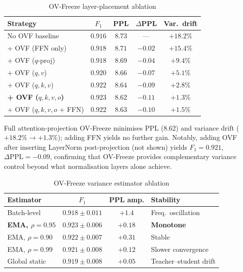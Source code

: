 \documentclass[lettersize,journal]{IEEEtran}
\begin{document}
\begin{table}[htbp]
\caption{OV-Freeze layer-placement ablation}
\label{tab:ovf_layer_ablation}
\centering
\renewcommand{\arraystretch}{1.15}
\small
\begin{tabular}{>{\raggedright\arraybackslash}p{3.2cm}cccc}
\toprule
\textbf{Strategy} & \textbf{$F_1$} & \textbf{PPL} & \textbf{$\Delta$PPL} & \textbf{Var.\ drift} \\
\midrule
No OVF baseline      & $0.916$ & $8.73$ & ---    & $+18.2\%$ \\
+ OVF (FFN only)     & $0.918$ & $8.71$ & $-0.02$ & $+15.4\%$ \\
+ OVF ($q$-proj)     & $0.918$ & $8.69$ & $-0.04$ & $+9.4\%$  \\
+ OVF ($q,v$)        & $0.920$ & $8.66$ & $-0.07$ & $+5.1\%$  \\
+ OVF ($q,k,v$)      & $0.922$ & $8.64$ & $-0.09$ & $+2.8\%$  \\
\textbf{+ OVF ($q,k,v,o$)} & $\mathbf{0.923}$ & $\mathbf{8.62}$
  & $\mathbf{-0.11}$ & $\mathbf{+1.3\%}$ \\
+ OVF ($q,k,v,o$ + FFN) & $0.922$ & $8.63$ & $-0.10$ & $+1.5\%$ \\
\bottomrule
\end{tabular}
\end{table}

Full attention-projection OV-Freeze minimises PPL (8.62) and variance
drift ($+18.2\%\rightarrow+1.3\%$); adding FFN yields no further gain.
Notably, adding OVF after inserting LayerNorm post-projection
(not shown) yields $F_1=0.921$, $\Delta\text{PPL}=-0.09$, confirming
that OV-Freeze provides complementary variance control beyond what
normalisation layers alone achieve.

\begin{table}[htbp]
\caption{OV-Freeze variance estimator ablation}
\label{tab:ovf_var_ablation}
\centering
\renewcommand{\arraystretch}{1.15}
\small
\begin{tabular}{l c c >{\centering\arraybackslash}p{1.8cm}}
\toprule
\textbf{Estimator} & \textbf{$F_1$} & \textbf{PPL amp.} & \textbf{Stability} \\
\midrule
Batch-level         & $0.918\pm0.011$ & $+1.4$ & Freq.\ oscillation \\
\textbf{EMA, $\rho=0.95$}
  & $\mathbf{0.923\pm0.006}$ & $\mathbf{+0.18}$ & \textbf{Monotone} \\
EMA, $\rho=0.90$    & $0.922\pm0.007$ & $+0.31$ & Stable \\
EMA, $\rho=0.99$    & $0.921\pm0.008$ & $+0.12$ & Slower convergence \\
Global static       & $0.919\pm0.008$ & $+0.05$ & Teacher--student drift \\
\bottomrule
\end{tabular}
\end{table}
\end{document}
